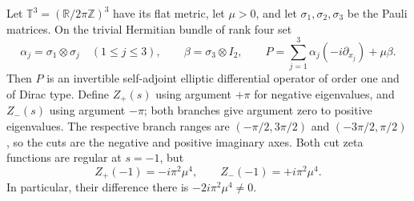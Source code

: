 \begin{theorem}\ours
\label{dev:1981-negative-cut}
Let \(\mathbb T^3=(\mathbb R/2\pi\mathbb Z)^3\) have its flat metric,
let \(\mu>0\), and let \(\sigma_1,\sigma_2,\sigma_3\) be the Pauli
matrices. On the trivial Hermitian bundle of rank four set
\[
 \alpha_j=\sigma_1\otimes\sigma_j\quad(1\le j\le3),
 \qquad \beta=\sigma_3\otimes I_2,
 \qquad
 P=\sum_{j=1}^3\alpha_j(-i\partial_{x_j})+\mu\beta.
\]
Then \(P\) is an invertible self-adjoint elliptic differential operator
of order one and of Dirac type. Define \(Z_+(s)\) using argument
\(+\pi\) for negative eigenvalues, and \(Z_-(s)\) using argument
\(-\pi\); both branches give argument zero to positive eigenvalues.
The respective branch ranges are \((-\pi/2,3\pi/2)\) and
\((-3\pi/2,\pi/2)\), so the cuts are the negative and positive
imaginary axes. Both cut zeta functions are regular at \(s=-1\), but
\[
 \boxed{Z_+(-1)=-i\pi^2\mu^4,\qquad
        Z_-(-1)=+i\pi^2\mu^4.} \tag{Z2}
\]
In particular, their difference there is \(-2i\pi^2\mu^4\ne0\).
\end{theorem}
